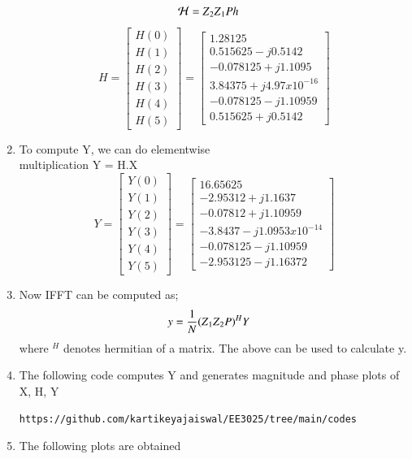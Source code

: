 \documentclass[journal,12pt,twocolumn]{IEEEtran}
\renewcommand\thesection{\arabic{section}}
\begin{document}
\begin{enumerate}[label=\thesection.\arabic*.,ref=\thesection.\theenumi]
\begin{align}
    \mathcal 
    H &= Z\textsubscript{2}Z\textsubscript{1}Ph
\end{align}
\begin{equation}
H = 
\begin{bmatrix}
H(0) \\ 
H(1) \\ 
H(2) \\ 
H(3) \\ 
H(4) \\ 
H(5) 
\end{bmatrix}
= 
\begin{bmatrix}
1.28125 \\ 
0.515625-j0.5142 \\ 
-0.078125+j1.1095 \\ 
3.84375 +j4.97x10^{-16} \\ 
-0.078125-j1.10959 \\ 
0.515625+j0.5142
\end{bmatrix}
\end{equation}
\item 
To compute Y, we can do elementwise \\ multiplication Y = H.X
\begin{equation}
Y = 
\begin{bmatrix}
Y(0) \\ 
Y(1) \\ 
Y(2) \\ 
Y(3) \\ 
Y(4) \\ 
Y(5) 
\end{bmatrix}
= 
\begin{bmatrix}
16.65625 \\ 
-2.95312+j1.1637 \\ 
-0.07812+j1.10959 \\ 
-3.8437 -j1.0953x10^{-14} \\ 
-0.078125-j1.10959 \\ 
-2.953125-j1.16372
\end{bmatrix}
\end{equation}

\item 
Now IFFT can be computed as;
\begin{equation}
\begin{aligned}
    y&= \frac{1}{N}(Z\textsubscript{1}Z\textsubscript{2}P)^HY 
\end{aligned}
\end{equation}
where $^{H}$ denotes hermitian of a matrix. 
The above can be used to calculate y.
\item
The following code computes Y and generates magnitude and phase plots of X, H, Y
\begin{lstlisting}
https://github.com/kartikeyajaiswal/EE3025/tree/main/codes
\end{lstlisting}
\item The following plots are obtained


\end{enumerate}
\end{document}

